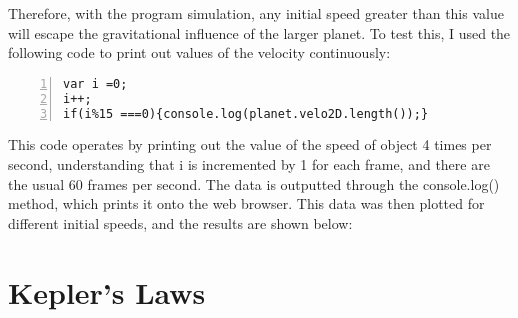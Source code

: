 Therefore, with the program simulation, any initial speed greater than this value will escape the gravitational influence of the larger planet.  To test this, I used the following code to print out values of the velocity continuously:

\begin{lstlisting}[breaklines=true, frame=single, numbers=left, caption=Code for printing out values of speed, label=lst:changestoorbit]
var i =0;
i++;
if(i%15 ===0){console.log(planet.velo2D.length());}
\end{lstlisting}

This code operates by printing out the value of the speed of object 4 times per second, understanding that i is incremented by 1 for each frame, and there are the usual 60 frames per second.  The data is outputted through the console.log() method, which prints it onto the web browser.  This data was then plotted for different initial speeds, and the results are shown below:






















\section{Kepler's Laws}






























